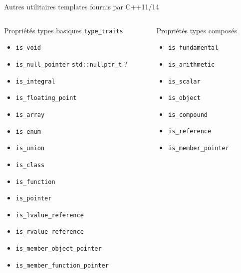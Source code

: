 \documentclass[handout,10pt]{beamer}
\begin{document}
\begin{frame}[fragile]{Autres utilitaires templates fournis par C++11/14}
\tiny
\begin{columns}
\begin{column}{0.33\textwidth}
\begin{block}{Propriétés types basiques \lstinline$type_traits$}
\begin{itemize}
\item {\color{blue}\lstinline$is_void$}
\item {\color{violet}\lstinline$is_null_pointer$} \lstinline$std::nullptr_t$ ?
\item {\color{blue}\lstinline$is_integral$} 
\item {\color{blue}\lstinline$is_floating_point$} 
\item {\color{blue}\lstinline$is_array$} 
\item {\color{blue}\lstinline$is_enum$} 
\item {\color{blue}\lstinline$is_union$} 
\item {\color{blue}\lstinline$is_class$} 
\item {\color{blue}\lstinline$is_function$} 
\item {\color{blue}\lstinline$is_pointer$} 
\item {\color{blue}\lstinline$is_lvalue_reference$} 
\item {\color{blue}\lstinline$is_rvalue_reference$} 
\item {\color{blue}\lstinline$is_member_object_pointer$} 
\item {\color{blue}\lstinline$is_member_function_pointer$}
\end{itemize}
\end{block}
\end{column}
\begin{column}{0.33\textwidth}
\begin{block}{Propriétés types composés}
\begin{itemize}
\item {\color{blue}\lstinline$is_fundamental$}
\item {\color{blue}\lstinline$is_arithmetic$}
\item {\color{blue}\lstinline$is_scalar$}
\item {\color{blue}\lstinline$is_object$}
\item {\color{blue}\lstinline$is_compound$}
\item {\color{blue}\lstinline$is_reference$}
\item {\color{blue}\lstinline$is_member_pointer$}

\end{itemize}
\end{block}
\end{column}
\end{columns}
\end{frame}
\end{document}

